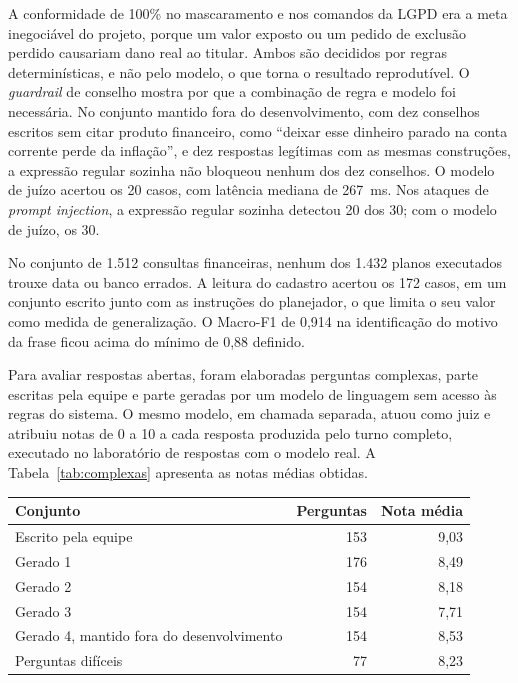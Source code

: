 A conformidade de 100\% no mascaramento e nos comandos da LGPD era a meta inegociável do projeto, porque um valor exposto ou um pedido de exclusão perdido causariam dano real ao titular. Ambos são decididos por regras determinísticas, e não pelo modelo, o que torna o resultado reprodutível. O \textit{guardrail} de conselho mostra por que a combinação de regra e modelo foi necessária. No conjunto mantido fora do desenvolvimento, com dez conselhos escritos sem citar produto financeiro, como ``deixar esse dinheiro parado na conta corrente perde da inflação'', e dez respostas legítimas com as mesmas construções, a expressão regular sozinha não bloqueou nenhum dos dez conselhos. O modelo de juízo acertou os 20 casos, com latência mediana de 267~ms. Nos ataques de \textit{prompt injection}, a expressão regular sozinha detectou 20 dos 30; com o modelo de juízo, os 30.

No conjunto de 1.512 consultas financeiras, nenhum dos 1.432 planos executados trouxe data ou banco errados. A leitura do cadastro acertou os 172 casos, em um conjunto escrito junto com as instruções do planejador, o que limita o seu valor como medida de generalização. O Macro-F1 de 0,914 na identificação do motivo da frase ficou acima do mínimo de 0,88 definido.

Para avaliar respostas abertas, foram elaboradas perguntas complexas, parte escritas pela equipe e parte geradas por um modelo de linguagem sem acesso às regras do sistema. O mesmo modelo, em chamada separada, atuou como juiz e atribuiu notas de 0 a 10 a cada resposta produzida pelo turno completo, executado no laboratório de respostas com o modelo real. A Tabela~\ref{tab:complexas} apresenta as notas médias obtidas.

\begin{tabela}[H]
\centering
\caption{Notas médias das respostas a perguntas complexas}
\label{tab:complexas}
\begin{tabular}{lrr}
\toprule
\textbf{Conjunto} & \textbf{Perguntas} & \textbf{Nota média} \\
\midrule
Escrito pela equipe & 153 & 9,03 \\
Gerado 1 & 176 & 8,49 \\
Gerado 2 & 154 & 8,18 \\
Gerado 3 & 154 & 7,71 \\
Gerado 4, mantido fora do desenvolvimento & 154 & 8,53 \\
Perguntas difíceis & 77 & 8,23 \\
\bottomrule
\end{tabular}
\authorssource
\end{tabela}

